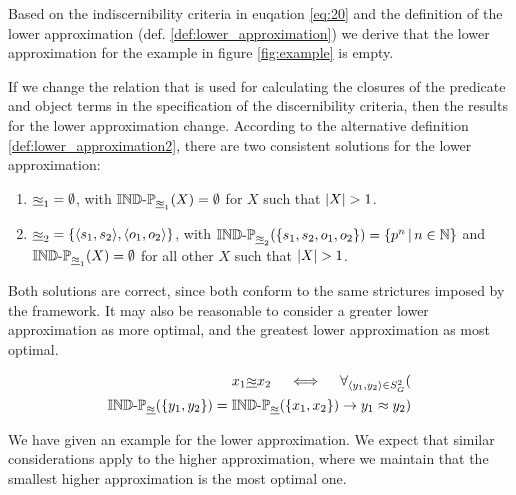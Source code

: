 Based on the indiscernibility criteria in euqation \ref{eq:20} and
  the definition of the lower approximation
  (def. \ref{def:lower_approximation})
  we derive that the lower approximation for the example
  in figure \ref{fig:example} is empty.

If we change the relation that is used for calculating
  the closures of the predicate and object terms
  in the specification of the discernibility criteria,
  then the results for the lower approximation change.
According to the alternative definition \ref{def:lower_approximation2},
  there are two consistent solutions for the lower approximation:
  \begin{enumerate}
    \item $\underline{\approx}_1 = \emptyset$,
          with $\operatorname{{\mathbb{IND}-\mathbb{P}}}_{\underline{\approx}_1}(X) = \emptyset$
          for $X$ such that $\lvert X\rvert > 1$.
    \item $\underline{\approx}_2 = \{\langle s_1,s_2\rangle,\langle o_1,o_2\rangle\}$,
          with $\operatorname{{\mathbb{IND}-\mathbb{P}}}_{\underline{\approx}_2}(\{s_1,s_2,o_1,o_2\}) = \{p^n\,\vert\,n \in \mathbb{N}\}$
          and $\operatorname{{\mathbb{IND}-\mathbb{P}}}_{\underline{\approx}_1}(X) = \emptyset$
          for all other $X$ such that $\lvert X\rvert > 1$.
  \end{enumerate}

Both solutions are correct,
  since both conform to the same strictures imposed by the framework.
It may also be reasonable to consider a greater lower approximation
  as more optimal, and the greatest lower approximation as most optimal.

\small
\begin{definition}
\begin{align}
\label{def:lower_approximation2}
  x_1 \underline{\approx} x_2
\quad \iff \quad
  \forall_{\langle y_1,y_2\rangle \in S_G^2}(\\
        \operatorname{{\mathbb{IND}-\mathbb{P}}}_{\underline{\approx}}(\{y_1,y_2\})
      =
        \operatorname{{\mathbb{IND}-\mathbb{P}}}_{\underline{\approx}}(\{x_1,x_2\})
    \rightarrow
      y_1 \approx y_2
  )\nonumber
\end{align}
\end{definition}
\normalsize

We have given an example for the lower approximation.
We expect that similar considerations apply to the higher approximation,
  where we maintain that the smallest higher approximation is
  the most optimal one.

